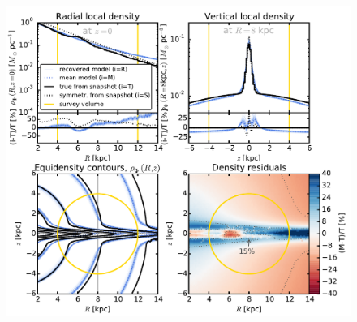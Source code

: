 \documentclass[iop,revtex4,numberedappendix,appendixfloats]{emulateapj}
\begin{document}
\begin{figure}[!htbp]
\centering
\includegraphics[width=\columnwidth]{fig/MNdHHdiffSph2_4kpc8Spiral_a_test1_density_overview.pdf}

\end{figure}
\end{document}

